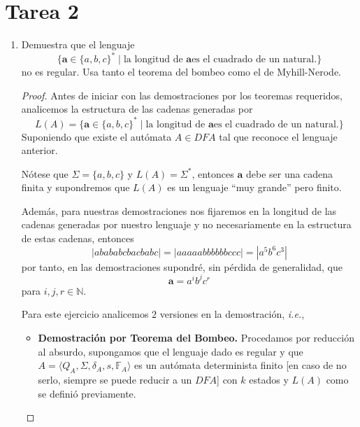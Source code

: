 \documentclass{article}
\begin{document}
\section*{\LARGE{Tarea 2}}
\begin{enumerate}
\item Demuestra que el lenguaje
  \[
  \{\mathbf{a} \in \{a, b, c\}^{*}\; |\; \text{la longitud de $\mathbf{a}$
    es el cuadrado de un natural.}\}
  \]
  no es regular. Usa tanto el teorema del bombeo como el de
  Myhill-Nerode.
  \begin{proof} Antes de iniciar con las demostraciones por los
    teoremas requeridos, analicemos la estructura de las cadenas
    generadas por
    \[
    L(A) = \{\mathbf{a} \in \{a, b, c\}^{*}\; |\; \text{la longitud de $\mathbf{a}$
    es el cuadrado de un natural.}\}
    \]
    Suponiendo que existe el autómata $A \in DFA$ tal que reconoce el lenguaje anterior.
    
    Nótese que $\Sigma = \{a,b,c\}$ y $L(A) = \Sigma^{*}$, entonces $\mathbf{a}$ debe
    ser una cadena finita y supondremos que $L(A)$ es un lenguaje ``muy grande'' pero
    finito.
    
    Además, para nuestras demostraciones nos fijaremos en la longitud de las cadenas
    generadas por nuestro lenguaje y no necesariamente en la estructura de estas
    cadenas, entonces
    \[
    |abababcbacbabc| = |aaaaabbbbbbccc| = |a^{5}b^{6}c^{3}|
    \]
    por tanto, en las demostraciones supondré, sin pérdida de generalidad, que
    \[
    \mathbf{a} = a^{i}b^{j}c^{r}
    \]
    para $i,j,r \in \mathbb{N}$.
    \begin{center}
    \end{center}
    Para este ejercicio analicemos $2$ versiones en la
    demostración, \textit{i.e.},
    \newcommand{\localtextbulletone}{\textcolor{black}{\raisebox{.45ex}{\rule{.6ex}{.6ex}}}}
    \renewcommand{\labelitemi}{\localtextbulletone}
    \begin{itemize}
    \item \textbf{Demostración por Teorema del Bombeo.} Procedamos por reducción al absurdo,
      supongamos que el lenguaje dado es regular y que $A = \langle Q_{A}, \Sigma, \delta_{A},
      s, \mathbb{F}_{A} \rangle$ es un autómata determinista finito [en caso de no serlo,
        siempre se puede reducir a un $DFA$] con $k$ estados y $L(A)$ como se definió previamente.
      

\end{itemize}
\end{proof}
\end{enumerate}
\end{document}
